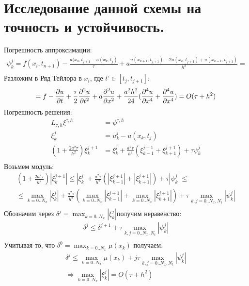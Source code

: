 \documentclass[12pt,a4paper]{scrartcl}
\begin{document}
\section{Исследование данной схемы на точность и устойчивость.}
Погрешность аппроксимации:
\begin{align*}
    \psi^{j}_k = f(x_i,t_{n+1}) - \frac{u(x_k,t_{j+1}-u(x_k,t_j)}{\tau}+a \frac{u(x_{k+1},t_{j+1}) - 2 u(x_k,t_{j+1})+u(x_{k-1},t_{j+1})}{h^{2}} = \\
\end{align*}
Разложим в Ряд Тейлора в $x_i$, где $t$'$ \in [t_j,t_{j+1}]$:
\[
=f- \pdv{u}{t}+ \frac{\tau}{2}\pdv[2]{u}{t}(x_{i},t^{'})+a \pdv[2]{u}{x}+ \frac{a^{2} h^{2}}{24}(\pdv[4]{u}{x}(x^{-},t_{j+1})+\pdv[4]{u}{x}(x^{+},t_{j+1})) = O(\tau+h^{2})\\   
\]
Погрешность решения:
\begin{align*}
    L_{\tau,h} \xi^{\tau,h} &= \psi^{\tau,h}\\
    \xi^{j}_{k} &= u^{j}_k - u(x_k,t_j) \\
    (1+ \frac{2 a^{2} \tau}{h^{2}}) \xi^{j+1}_{k} &= \xi^{j}_{k}+ \frac{a^{2} \tau}{h^{2}} (\xi^{j+1}_{k-1}+\xi^{j+1}_{k+1}) +\tau \psi^{j}_k\\
\end{align*}
Возьмем модуль:
\begin{align*}
    (1+ \frac{2 a^{2} \tau}{h^{2}})| \xi^{j+1}_{k}|  \le |\xi^{j}_{k}|+ \frac{a^{2} \tau}{h^{2}} (|\xi^{j+1}_{k-1}|+|\xi^{j+1}_{k+1}|) +\tau |\psi^{j}_k | \le\\
    \le \max_{k=0..N_{x}} |\xi^{j}_{k}|+ \frac{a^{2} \tau}{h^{2}} (\max_{k=0..N_{x}}|\xi^{j+1}_{k-1}|+\max_{k=0..N_{x}}|\xi^{j+1}_{k+1}|) +\tau \max_{k,j=0..N_{x},N_{t}}|\psi^{j}_k|\\
\end{align*}
Обозначим через $\delta^{j} = \max_{k=0..N_{x}} |\xi^{j}_{k}|$получим неравенство:
\begin{align*}
    \delta^{j} \le \delta^{j+1}+\tau \max_{k,j=0..N_{x},N_{t}}|\psi^{j}_k| \\
\end{align*}
Учитывая то, что $\delta^{0} = \max_{k=0..N_{x}} \mu(x_k)$ получаем:
\begin{align*}
    \delta^j \le \max_{k=0..N_{x}} \mu(x_k) + j \tau \max_{k,j=0..N_{x},N_{t}}|\psi^{j}_k| \\
    \Rightarrow \max_{k=0..N_{x}} |\xi^{j}_{k}| = O(\tau + h^{2})
\end{align*}
\end{document}
